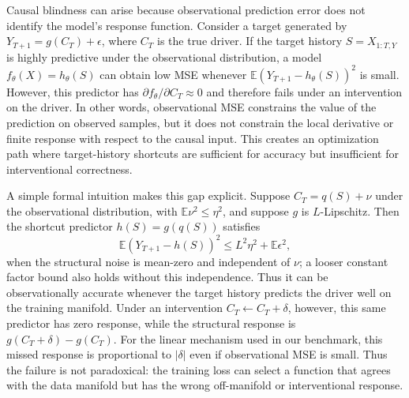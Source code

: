 \documentclass{article}
\begin{document}
Causal blindness can arise because observational prediction error does not identify
the model's response function. Consider a target generated by
$Y_{T+1}=g(C_T)+\epsilon$, where $C_T$ is the true driver. If the target history
$S=X_{1:T,Y}$ is highly predictive under the observational distribution, a model
$f_\theta(X)=h_\theta(S)$ can obtain low MSE whenever
$\mathbb{E}(Y_{T+1}-h_\theta(S))^2$ is small. However, this predictor has
$\partial f_\theta/\partial C_T \approx 0$ and therefore fails under an intervention
on the driver. In other words, observational MSE constrains the value of the
prediction on observed samples, but it does not constrain the local derivative or
finite response with respect to the causal input. This creates an optimization path
where target-history shortcuts are sufficient for accuracy but insufficient for
interventional correctness.

A simple formal intuition makes this gap explicit. Suppose
$C_T=q(S)+\nu$ under the observational distribution, with
$\mathbb{E}\nu^2\leq \eta^2$, and suppose $g$ is $L$-Lipschitz. Then the
shortcut predictor $h(S)=g(q(S))$ satisfies
\begin{equation}
\mathbb{E}\left(Y_{T+1}-h(S)\right)^2
\leq
L^2\eta^2 + \mathbb{E}\epsilon^2,
\end{equation}
when the structural noise is mean-zero and independent of $\nu$; a looser constant
factor bound also holds without this independence. Thus it can be observationally
accurate whenever the target history predicts the driver well on the training
manifold. Under an intervention
$C_T \leftarrow C_T+\delta$, however, this same predictor has zero response, while
the structural response is $g(C_T+\delta)-g(C_T)$. For the linear mechanism used in
our benchmark, this missed response is proportional to $|\delta|$ even if
observational MSE is small. Thus the failure is not paradoxical: the training loss
can select a function that agrees with the data manifold but has the wrong
off-manifold or interventional response.
\end{document}
